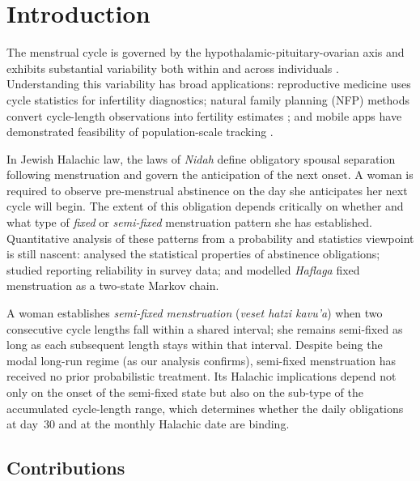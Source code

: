 \documentclass[12pt,a4paper]{article}
\newcommand{\haflaga}{\textit{Haflaga}}
\begin{document}
\newpage

\section{Introduction}
\label{sec:intro}

The menstrual cycle is governed by the hypothalamic-pituitary-ovarian axis and
exhibits substantial variability both within and across individuals
\citep{Treloar1967, Chiazze1968, Munster1992}.  Understanding this variability
has broad applications: reproductive medicine uses cycle statistics for infertility
diagnostics; natural family planning (NFP) methods convert cycle-length observations
into fertility estimates \citep{Fehring2006}; and mobile apps have demonstrated
feasibility of population-scale tracking \citep{Symul2019, Bull2019}.

In Jewish Halachic law, the laws of \textit{Nidah} define obligatory spousal
separation following menstruation and govern the anticipation of the next onset.
A woman is required to observe pre-menstrual abstinence on the day she anticipates
her next cycle will begin.  The extent of this obligation depends critically on
whether and what type of \emph{fixed} or \emph{semi-fixed} menstruation pattern she
has established.  Quantitative analysis of these patterns from a probability and
statistics viewpoint is still nascent: \citet{Ross2023stat} analysed the
statistical properties of abstinence obligations; \citet{Ross2024reliability}
studied reporting reliability in survey data; and \citet{Ross2024markov} modelled
\haflaga{} fixed menstruation as a two-state Markov chain.

A woman establishes \emph{semi-fixed menstruation} (\textit{veset hatzi kavu'a})
when two consecutive cycle lengths fall within a shared interval; she remains
semi-fixed as long as each subsequent length stays within that interval.  Despite
being the modal long-run regime (as our analysis confirms), semi-fixed menstruation
has received no prior probabilistic treatment.  Its Halachic implications depend
not only on the onset of the semi-fixed state but also on the sub-type of the
accumulated cycle-length range, which determines whether the daily obligations at
day~30 and at the monthly Halachic date are binding.

\subsection*{Contributions}
\end{document}
